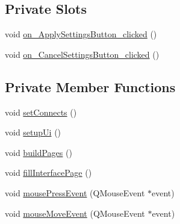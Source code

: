 \subsection*{Private Slots}
\begin{DoxyCompactItemize}
\item 
void \hyperlink{class_matty_settings_dialog_a8865f6098ec5170a9b2883827e5f7d1d}{on\+\_\+\+Apply\+Settings\+Button\+\_\+clicked} ()
\item 
void \hyperlink{class_matty_settings_dialog_afac985297c5a7a526a036b84ce99e606}{on\+\_\+\+Cancel\+Settings\+Button\+\_\+clicked} ()
\end{DoxyCompactItemize}
\subsection*{Private Member Functions}
\begin{DoxyCompactItemize}
\item 
void \hyperlink{class_matty_settings_dialog_a4e0c6d5ea1b0a3a40a0f856386c21bce}{set\+Connects} ()
\item 
void \hyperlink{class_matty_settings_dialog_a40b182c3af83d351a4315c83f6b1c979}{setup\+Ui} ()
\item 
void \hyperlink{class_matty_settings_dialog_a92444461b31265858791d279e483069d}{build\+Pages} ()
\item 
void \hyperlink{class_matty_settings_dialog_a4c8eaeb364e8fa94fe89fdbe2eb822b5}{fill\+Interface\+Page} ()
\item 
void \hyperlink{class_matty_settings_dialog_aa3af114eb9192cf2ce488194bb30b761}{mouse\+Press\+Event} (Q\+Mouse\+Event $\ast$event)
\item 
void \hyperlink{class_matty_settings_dialog_a87e407b4afdfc3b255c4b5de1699349d}{mouse\+Move\+Event} (Q\+Mouse\+Event $\ast$event)
\end{DoxyCompactItemize}

